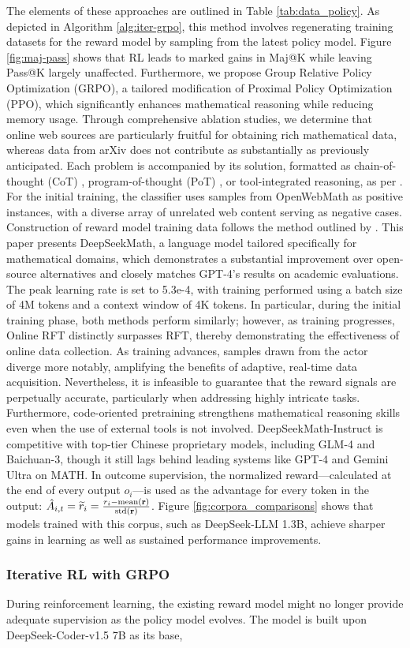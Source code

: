 The elements of these approaches are outlined in Table \ref{tab:data_policy}. As depicted in Algorithm \ref{alg:iter-grpo}, this method involves regenerating training datasets for the reward model by sampling from the latest policy model. Figure \ref{fig:maj-pass} shows that RL leads to marked gains in Maj@K while leaving Pass@K largely unaffected. Furthermore, we propose Group Relative Policy Optimization (GRPO), a tailored modification of Proximal Policy Optimization (PPO), which significantly enhances mathematical reasoning while reducing memory usage. Through comprehensive ablation studies, we determine that online web sources are particularly fruitful for obtaining rich mathematical data, whereas data from arXiv does not contribute as substantially as previously anticipated. Each problem is accompanied by its solution, formatted as chain-of-thought (CoT) \citep{cot}, program-of-thought (PoT) \citep{pot,pal}, or tool-integrated reasoning, as per \citep{tora}. For the initial training, the classifier uses samples from OpenWebMath \citep{openwebmath} as positive instances, with a diverse array of unrelated web content serving as negative cases. Construction of reward model training data follows the method outlined by \citep{wang2023math}. This paper presents DeepSeekMath, a language model tailored specifically for mathematical domains, which demonstrates a substantial improvement over open-source alternatives and closely matches GPT-4’s results on academic evaluations. The peak learning rate is set to 5.3e-4, with training performed using a batch size of 4M tokens and a context window of 4K tokens. In particular, during the initial training phase, both methods perform similarly; however, as training progresses, Online RFT distinctly surpasses RFT, thereby demonstrating the effectiveness of online data collection. As training advances, samples drawn from the actor diverge more notably, amplifying the benefits of adaptive, real-time data acquisition. Nevertheless, it is infeasible to guarantee that the reward signals are perpetually accurate, particularly when addressing highly intricate tasks. Furthermore, code-oriented pretraining strengthens mathematical reasoning skills even when the use of external tools is not involved. DeepSeekMath-Instruct is competitive with top-tier Chinese proprietary models, including GLM-4 and Baichuan-3, though it still lags behind leading systems like GPT-4 and Gemini Ultra on MATH. In outcome supervision, the normalized reward—calculated at the end of every output $o_i$—is used as the advantage for every token in the output: $\hat{A}_{i, t} = \widetilde{r}_i = \frac{r_i- {\rm mean}(\mathbf{r})}{{\rm std}(\mathbf{r})}$. Figure \ref{fig:corpora_comparisons} shows that models trained with this corpus, such as DeepSeek-LLM 1.3B, achieve sharper gains in learning as well as sustained performance improvements. \subsubsection{Iterative RL with GRPO} During reinforcement learning, the existing reward model might no longer provide adequate supervision as the policy model evolves. The model is built upon DeepSeek-Coder-v1.5 7B as its base, 